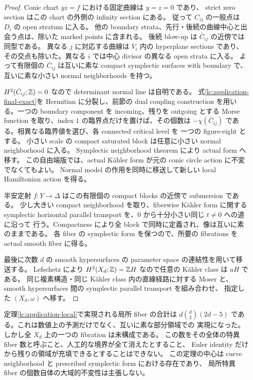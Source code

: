 \begin{proof}
Conic chart $yz=f$ における固定曲線は $y=z=0$ であり、
strict zero section はこの chart の外側の infinity section にある。
従って $C_{ij}$ の一般点は $D_i$ の open stratum に入る。
他の boundary strata、先行・後続の曲線中心と出会う点は、除いた marked points に含まれる。
後続 blow-up は $\bar C_{ij}$ の近傍では同型である。
異なる $j$ に対応する曲線は $V_i$ 内の hyperplane sections であり、
その交点も除いた。異なる $i$ では中心 divisor の異なる open strata に入る。
よって有限個の $\bar C_{ij}$ は互いに素な compact symplectic surfaces with boundary で、
互いに素な小さい normal neighborhoods を持つ。

$H^2(\bar C_{ij};\mathbb Z)=0$ なので determinant normal line は自明である。
式\eqref{lc:application-final-exact}を Hermitian に分裂し、前節の dual coupling
construction を用いる。一つの boundary component を incoming、残りを outgoing とする
Morse function を取り、index $1$ の臨界点だけを置けば、その個数は
$-\chi(\bar C_{ij})$ である。相異なる臨界値を選び、各 connected critical level を
一つの figure-eight とする。
小さい scale の compact saturated block は任意に小さい normal neighborhood に入る。
Symplectic neighborhood theorem により actual form へ移す。
この自由端版では、actual Kähler form が元の conic circle action に不変でなくてもよい。
Normal model の作用を同時に移送して新しい local Hamiltonian action を得る。

半安定射 $f:Y\to\Delta$ はこの有限個の compact blocks の近傍で submersion である。
少し大きい compact neighborhood を取り、fiberwise Kähler form に関する
symplectic horizontal parallel transport を、$0$ から十分小さい同じ $t\ne0$ への道に沿って
行う。Compactness により全 block で同時に定義され、像は互いに素のままである。
各 fiber の symplectic form を保つので、所要の fibrations を actual smooth fiber に得る。

最後に次数 $d$ の smooth hypersurfaces の parameter space の連結性を用いて移送する。
Lefschetz により $H^2(X_d;\mathbb Z)=\mathbb Z H$ なので任意の Kähler class は $aH$ である。
同じ複素構造・同じ Kähler class 内の直線経路に対する Moser と、
smooth hypersurfaces 間の symplectic parallel transport を組み合わせ、
指定した $(X_d,\omega)$ へ移す。
\end{proof}

\begin{remark}\label{lc:application-no-global-count}
定理\ref{lc:application-local}で実現される局所 fiber の合計は
$d\binom d2(2d-5)$ である。これは数値上の予測だけでなく、互いに素な部分領域での
実現になった。しかし全 $X_d$ 上の一つの fibration は未構成である。
この数をその全体の特異 fiber 数と呼ぶこと、人工的な境界が全て消えたとすること、
Euler identity だけから残りの領域が充填できるとすることはできない。
この定理の中心は curve neighborhood と prescribed symplectic form における存在であり、
局所特異 fiber の個数自体の大域的不変性は主張しない。
\end{remark}

